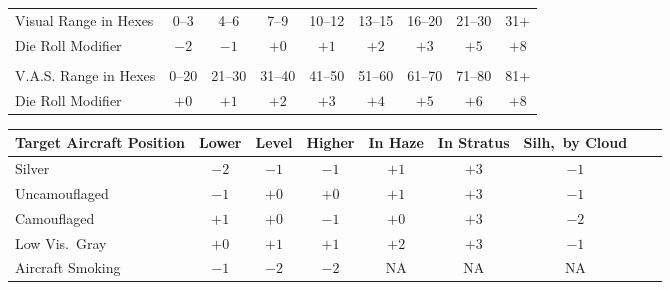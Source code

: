 

\begin{twocolumntablefloat}
\begin{twocolumntable}
\begin{tabular}{lcccccccc}
\toprule
Visual Range in Hexes&0--3&4--6&7--9&10--12&13--15&16--20&21--30&31+\\
Die Roll Modifier&$-2$&$-1$&$+0$&$+1$&$+2$&$+3$&$+5$&$+8$\\
\midrule
\\
\midrule
V.A.S. Range in Hexes&0--20&21--30&31--40&41--50&51--60&61--70&71--80&81+\\
Die Roll Modifier&$+0$&$+1$&$+2$&$+3$&$+4$&$+5$&$+6$&$+8$\\
\bottomrule
\end{tabular}
\begin{tablenote}{0.75\linewidth}
\end{tablenote}
\end{twocolumntable}
\end{twocolumntablefloat}

\begin{twocolumntablefloat}
\begin{twocolumntable}
\begin{tabular}{lcccccccc}
\toprule
Target Aircraft Position&Lower&Level&Higher&In Haze&In Stratus&Silh,\ by Cloud\\
\midrule
Silver          &$-2$&$-1$&$-1$&$+1$&$+3$&$-1$\\
Uncamouflaged   &$-1$&$+0$&$+0$&$+1$&$+3$&$-1$\\
Camouflaged     &$+1$&$+0$&$-1$&$+0$&$+3$&$-2$\\
Low Vis.\ Gray  &$+0$&$+1$&$+1$&$+2$&$+3$&$-1$\\
Aircraft Smoking&$-1$&$-2$&$-2$&NA&NA&NA\\
\bottomrule
\end{tabular}
\end{twocolumntable}
\end{twocolumntablefloat}

